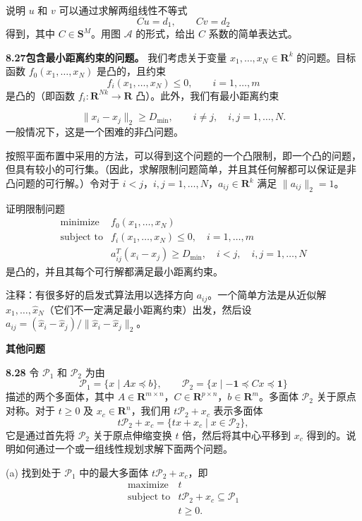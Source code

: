 \documentclass[UTF8, 12pt, fontset=fandol, oneside]{ctexart}
\begin{document}
说明 $u$ 和 $v$ 可以通过求解两组线性不等式
\[
Cu=d_1,\qquad Cv=d_2
\]
得到，其中 $C\in\mathbf{S}^M$。用图 $\mathcal A$ 的形式，给出 $C$ 系数的简单表达式。

\noindent\textbf{8.27\quad 包含最小距离约束的问题。}
我们考虑关于变量 $x_1,\ldots,x_N\in\mathbf{R}^k$ 的问题。目标函数 $f_0(x_1,\ldots,x_N)$ 是凸的，且约束
\[
f_i(x_1,\ldots,x_N)\leq 0,\qquad i=1,\ldots,m
\]
是凸的（即函数 $f_i:\mathbf{R}^{Nk}\to\mathbf{R}$ 凸）。此外，我们有最小距离约束

\[
\|x_i-x_j\|_2\geq D_{\min},\qquad i\neq j,\quad i,j=1,\ldots,N.
\]
一般情况下，这是一个困难的非凸问题。

按照平面布置中采用的方法，可以得到这个问题的一个凸限制，即一个凸的问题，但具有较小的可行集。（因此，求解限制问题简单，并且其任何解都可以保证是非凸问题的可行解。）令对于 $i<j$，$i,j=1,\ldots,N$，$a_{ij}\in\mathbf{R}^k$ 满足 $\|a_{ij}\|_2=1$。

证明限制问题
\[
\begin{array}{ll}
\mbox{minimize} & f_0(x_1,\ldots,x_N)\\
\mbox{subject to} & f_i(x_1,\ldots,x_N)\leq 0,\quad i=1,\ldots,m\\
& a_{ij}^T(x_i-x_j)\geq D_{\min},\quad i<j,\quad i,j=1,\ldots,N
\end{array}
\]
是凸的，并且其每个可行解都满足最小距离约束。

注释：有很多好的启发式算法用以选择方向 $a_{ij}$。一个简单方法是从近似解 $\hat x_1,\ldots,\hat x_N$（它们不一定满足最小距离约束）出发，然后设 $a_{ij}=(\hat x_i-\hat x_j)/\|\hat x_i-\hat x_j\|_2$。

\noindent\textbf{其他问题}

\noindent\textbf{8.28}
令 $\mathcal P_1$ 和 $\mathcal P_2$ 为由
\[
\mathcal P_1=\{x\mid Ax\preceq b\},\qquad
\mathcal P_2=\{x\mid -\mathbf{1}\preceq Cx\preceq \mathbf{1}\}
\]
描述的两个多面体，其中 $A\in\mathbf{R}^{m\times n}$，$C\in\mathbf{R}^{p\times n}$，$b\in\mathbf{R}^m$。多面体 $\mathcal P_2$ 关于原点对称。对于 $t\geq 0$ 及 $x_c\in\mathbf{R}^n$，我们用 $t\mathcal P_2+x_c$ 表示多面体
\[
t\mathcal P_2+x_c=\{tx+x_c\mid x\in\mathcal P_2\},
\]
它是通过首先将 $\mathcal P_2$ 关于原点伸缩变换 $t$ 倍，然后将其中心平移到 $x_c$ 得到的。说明如何通过一个或一组线性规划求解下面两个问题。

(a) 找到处于 $\mathcal P_1$ 中的最大多面体 $t\mathcal P_2+x_c$，即
\[
\begin{array}{ll}
\mbox{maximize} & t\\
\mbox{subject to} & t\mathcal P_2+x_c\subseteq\mathcal P_1\\
& t\geq 0.
\end{array}
\]
\end{document}
